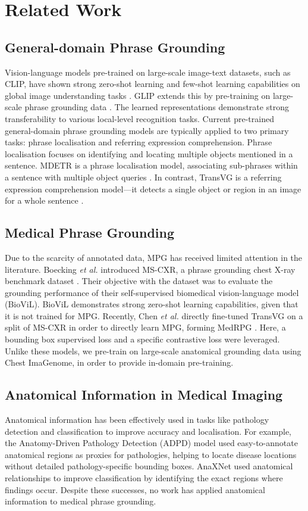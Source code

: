 \section{Related Work}
\subsection{General-domain Phrase Grounding}
Vision-language models pre-trained on large-scale image-text datasets, such as CLIP, have shown strong zero-shot learning and few-shot learning capabilities on global image understanding tasks \cite{pmlr-v139-radford21a}. GLIP extends this by pre-training on large-scale phrase grounding data \cite{9879567}. The learned representations demonstrate strong transferability to various local-level recognition tasks. Current pre-trained general-domain phrase grounding models are typically applied to two primary tasks: phrase localisation and referring expression comprehension. Phrase localisation focuses on identifying and locating multiple objects mentioned in a sentence. MDETR is a phrase localisation model, associating sub-phrases within a sentence with multiple object queries \cite{9710994}. In contrast, TransVG is a referring expression comprehension model---it detects a single object or region in an image for a whole sentence \cite{9710016}.

\subsection{Medical Phrase Grounding}
Due to the scarcity of annotated data, MPG has received limited attention in the literature. Boecking \textit{et al.} introduced MS-CXR, a phrase grounding chest X-ray benchmark dataset \cite{10.1007/978-3-031-20059-5_1}. Their objective with the dataset was to evaluate the grounding performance of their self-supervised biomedical vision-language model (BioViL). BioViL demonstrates strong zero-shot learning capabilities, given that it is not trained for MPG. Recently, Chen \textit{et al.} directly fine-tuned TransVG on a split of MS-CXR in order to directly learn MPG, forming MedRPG \cite{10.1007/978-3-031-43990-2_35}. Here, a bounding box supervised loss and a specific contrastive loss were leveraged. Unlike these models, we pre-train on large-scale anatomical grounding data using Chest ImaGenome, in order to provide in-domain pre-training.

\subsection{Anatomical Information in Medical Imaging}
Anatomical information has been effectively used in tasks like pathology detection and classification to improve accuracy and localisation. For example, the Anatomy-Driven Pathology Detection (ADPD) model \cite{muller_anatomy-driven_2023} used easy-to-annotate anatomical regions as proxies for pathologies, helping to locate disease locations without detailed pathology-specific bounding boxes. AnaXNet \cite{agu_anaxnet_2021} used anatomical relationships to improve classification by identifying the exact regions where findings occur. Despite these successes, no work has applied anatomical information to medical phrase grounding.
